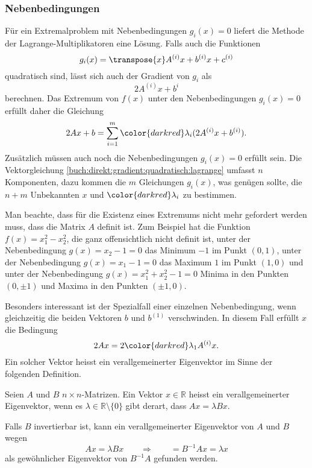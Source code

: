 %
%
\subsubsection{Nebenbedingungen}
Für ein Extremalproblem mit Nebenbedingungen $g_i(x)=0$ liefert die
Methode der Lagrange-Multiplikatoren eine Lösung.
Falls auch die Funktionen
\[
g_i(x)
=
\transpose{x}A^{(i)}x + b^{(i)}x + c^{(i)}
\]
quadratisch sind, lässt sich auch der Gradient von $g_i$ als
\[
2A^{(i)}x + b^{i}
\]
berechnen.
Das Extremum von $f(x)$ unter den Nebenbedingungen $g_i(x)=0$ erfüllt
daher die Gleichung
\begin{equation}
2Ax + b
=
\sum_{i=1}^m {\color{darkred}\lambda_i} (2A^{(i)}x+b^{(i)}).
\label{buch:direkt:gradient:quadratisch:lagrange}
\end{equation}
Zusätzlich müssen auch noch die Nebenbedingungen $g_i(x)=0$ erfüllt sein.
Die Vektorgleichung \eqref{buch:direkt:gradient:quadratisch:lagrange}
umfasst $n$ Komponenten, dazu kommen die $m$ Gleichungen $g_i(x)$,
was genügen sollte, die $n+m$ Unbekannten $x$ und ${\color{darkred}\lambda_i}$
zu bestimmen.

Man beachte, dass für die Existenz eines Extremums nicht mehr gefordert
werden muss, dass die Matrix $A$ definit ist.
Zum Beispiel hat die Funktion $f(x) = x_1^2 - x_2^2$, die ganz offensichtlich
nicht definit ist,
unter der Nebenbedingung $g(x)=x_2-1=0$ das Minimum $-1$ im Punkt $(0,1)$,
unter der Nebenbedingung $g(x)=x_1-1=0$ das Maximum $1$ im Punkt $(1,0)$ und
unter der Nebenbedingung $g(x)=x_1^2+x_2^2-1=0$ Minima in den Punkten
$(0,\pm1)$ und Maxima in den Punkten $(\pm1,0)$.

Besonders interessant ist der Spezialfall einer einzelnen Nebenbedingung,
wenn gleichzeitig die beiden Vektoren $b$ und $b^{(1)}$ verschwinden.
In diesem Fall erfüllt $x$ die Bedingung
\[
2Ax=2{\color{darkred}\lambda_1}A^{(i)}x.
\]
Ein solcher Vektor heisst ein verallgemeinerter Eigenvektor im Sinne
der folgenden Definition.

\begin{definition}
Seien $A$ und $B$ $n\times n$-Matrizen.
Ein Vektor $x\in\mathbb{R}$ heisst ein verallgemeinerter Eigenvektor,
wenn es $\lambda\in\mathbb{R}\setminus \{0\}$ gibt derart, dass
$Ax=\lambda Bx$.
\end{definition}

Falls $B$ invertierbar ist, kann ein verallgemeinerter Eigenvektor von $A$
und $B$ wegen
\[
Ax=\lambda Bx
\qquad\Rightarrow\qquad
=
B^{-1}Ax=\lambda x
\]
als gewöhnlicher Eigenvektor von $B^{-1}A$ gefunden werden.

